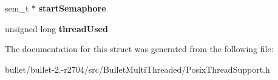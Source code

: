 \begin{DoxyCompactItemize}
\item 
\hypertarget{struct_posix_thread_support_1_1bt_spu_status_a494b090b9cacac7d4bf8e57697453175}{sem\+\_\+t $\ast$ {\bfseries start\+Semaphore}}\label{struct_posix_thread_support_1_1bt_spu_status_a494b090b9cacac7d4bf8e57697453175}

\item 
\hypertarget{struct_posix_thread_support_1_1bt_spu_status_ad35a430623350968c39e4b80038ae67a}{unsigned long {\bfseries thread\+Used}}\label{struct_posix_thread_support_1_1bt_spu_status_ad35a430623350968c39e4b80038ae67a}

\end{DoxyCompactItemize}


The documentation for this struct was generated from the following file\+:\begin{DoxyCompactItemize}
\item 
bullet/bullet-\/2.-\/r2704/src/\+Bullet\+Multi\+Threaded/Posix\+Thread\+Support.\+h\end{DoxyCompactItemize}
